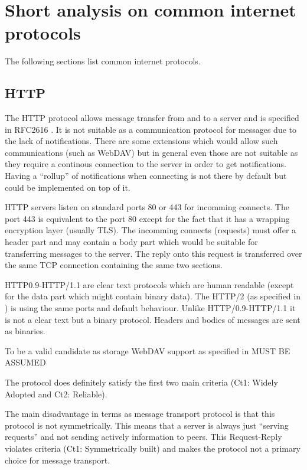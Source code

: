 \documentclass[a4paper,appendixprefix,pdfusetitle,twocolumn,draft,8pt]{scrbook}
\begin{document}
\twocolumn
\chapter{Short analysis on common internet protocols}
The following sections list common internet protocols.

\section{HTTP}
The HTTP protocol allows message transfer from and to a server and is specified in RFC2616 \cite{RFC2616}. It is not suitable as a communication protocol for messages due to the lack of notifications. There are some extensions which would allow such communications (such as WebDAV) but in general even those are not suitable as they require a continous connection to the server in order to get notifications. Having a ``rollup'' of notifications when connecting is not there by default but could be implemented on top of it. 

HTTP servers listen on standard ports 80 or 443 for incomming connects. The port 443 is equivalent to the port 80 except for the fact that it has a wrapping encryption layer (usually TLS). The incomming connects (requests) must offer a header part and may contain a body part which would be suitable for transferring messages to the server. The reply onto this request is transferred over the same TCP connection containing the same two sections.

HTTP0.9-HTTP/1.1 are clear text protocols which are human readable (except for the data part which might contain binary data). The HTTP/2 (as specified in \cite{RFC7540}) is using the same ports and default behaviour. Unlike HTTP/0.9-HTTP/1.1 it is not a clear text but a binary protocol. Headers and bodies of messages are sent as binaries. 

To be a valid candidate as storage WebDAV support as specified in \cite{rfc4918} MUST BE ASSUMED

The protocol does definitely satisfy the first two main criteria (Ct1: Widely Adopted and Ct2: Reliable).

The main disadvantage in terms as message transport protocol is that this protocol is not symmetrically. This means that a server is always just ``serving requests'' and not sending actively information to peers. This Request-Reply violates criteria (Ct1: Symmetrically built) and makes the protocol not a primary choice for  message transport. 
\end{document}
